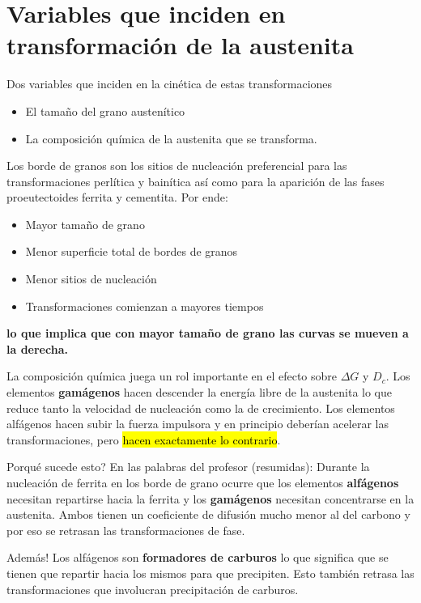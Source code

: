 \section[Transformación de la austenita]{Variables que inciden en transformación de la austenita}
Dos variables que inciden en la cinética de estas transformaciones
\begin{itemize}
    \item El tamaño del grano austenítico
    \item La composición química de la austenita que se transforma.
\end{itemize}

Los borde de granos son los sitios de nucleación preferencial para las transformaciones perlítica y bainítica así como para la aparición de las fases proeutectoides ferrita y cementita. Por ende:
\begin{itemize}
    \item Mayor tamaño de grano \goright
    \item[\goright] Menor superficie total de bordes de granos \goright
    \item[\goright] Menor sitios de nucleación \goright
    \item[\goright] Transformaciones comienzan a mayores tiempos
\end{itemize}
\textbf{lo que implica que con mayor tamaño de grano las curvas se mueven a la derecha.}

La composición química juega un rol importante en el efecto sobre $\Delta G$ y $D_c$. Los elementos \textbf{gamágenos} hacen descender la energía libre de la austenita lo que reduce tanto la velocidad de nucleación como la de crecimiento. Los elementos alfágenos hacen subir la fuerza impulsora y en principio deberían acelerar las transformaciones, pero \hl{hacen exactamente lo contrario}.

Porqué sucede esto? En las palabras del profesor (resumidas): Durante la nucleación de ferrita en los borde de grano ocurre que los elementos \textbf{alfágenos} necesitan repartirse hacia la ferrita y los \textbf{gamágenos} necesitan concentrarse en la austenita. Ambos tienen un coeficiente de difusión mucho menor al del carbono y por eso se retrasan las transformaciones de fase.

Además! Los alfágenos son \textbf{formadores de carburos} lo que significa que se tienen que repartir hacia los mismos para que precipiten. Esto también retrasa las transformaciones que involucran precipitación de carburos. 

